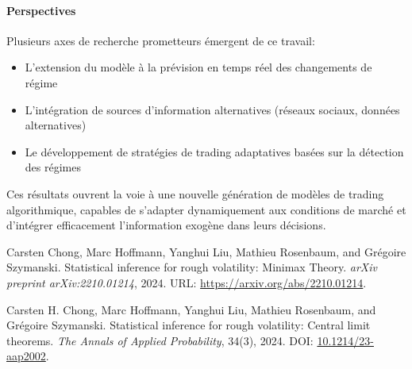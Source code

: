 \documentclass[10pt,a4paper]{article}
\theoremstyle{definition}
\theoremstyle{remark}
\begin{document}

\paragraph{\textbf{Perspectives}} Plusieurs axes de recherche prometteurs émergent de ce travail:
\begin{itemize}
    \item L'extension du modèle à la prévision en temps réel des changements de régime
    \item L'intégration de sources d'information alternatives (réseaux sociaux, données alternatives)
    \item Le développement de stratégies de trading adaptatives basées sur la détection des régimes
\end{itemize}

Ces résultats ouvrent la voie à une nouvelle génération de modèles de trading algorithmique, capables de s'adapter dynamiquement aux conditions de marché et d'intégrer efficacement l'information exogène dans leurs décisions.

\newpage
\begin{thebibliography}{9}

Carsten Chong, Marc Hoffmann, Yanghui Liu, Mathieu Rosenbaum, and Grégoire Szymanski.
\newblock Statistical inference for rough volatility: Minimax Theory.
\newblock \emph{arXiv preprint arXiv:2210.01214}, 2024.
\newblock URL: \url{https://arxiv.org/abs/2210.01214}.

Carsten H. Chong, Marc Hoffmann, Yanghui Liu, Mathieu Rosenbaum, and Grégoire Szymanski.
\newblock Statistical inference for rough volatility: Central limit theorems.
\newblock \emph{The Annals of Applied Probability}, 34(3), 2024.
\newblock DOI: \href{http://dx.doi.org/10.1214/23-AAP2002}{10.1214/23-aap2002}.

\end{thebibliography}
\end{document}
